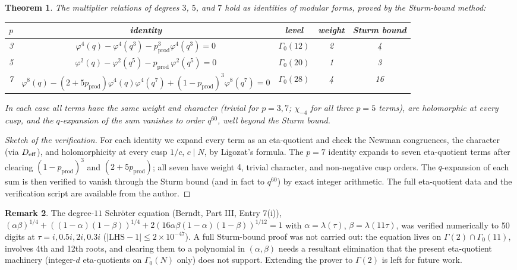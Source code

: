 \documentclass[11pt]{amsart}
\theoremstyle{plain}
\newtheorem{theorem}{Theorem}[section]
\theoremstyle{definition}
\newtheorem{remark}[theorem]{Remark}
\theoremstyle{remark}
\newcommand{\pprod}{p_{\mathrm{prod}}}
\begin{document}
\begin{theorem}
The multiplier relations of degrees $3$, $5$, and $7$ hold as identities of modular
forms, proved by the Sturm-bound method:
\begin{center}
\begin{tabular}{c|c|c|c|c}
$p$ & identity & level & weight & Sturm bound \\ \hline
3 & $\varphi^4(q) - \varphi^4(q^3) - \pprod^3\varphi^4(q^3) = 0$ & $\Gamma_0(12)$ & 2 & 4 \\
5 & $\varphi^2(q) - \varphi^2(q^5) - \pprod\,\varphi^2(q^5) = 0$ & $\Gamma_0(20)$ & 1 & 3 \\
7 & $\varphi^8(q) - (2+5\pprod)\varphi^4(q)\varphi^4(q^7)
+ (1-\pprod)^3\varphi^8(q^7) = 0$ & $\Gamma_0(28)$ & 4 & 16
\end{tabular}
\end{center}
In each case all terms have the same weight and character (trivial for $p=3,7$;
$\chi_{-4}$ for all three $p=5$ terms), are holomorphic at every cusp, and the
$q$-expansion of the sum vanishes to order $q^{60}$, well beyond the Sturm bound.
\end{theorem}

\begin{proof}[Sketch of the verification]
For each identity we expand every term as an eta-quotient and check the Newman
congruences, the character (via $D_{\rm eff}$), and holomorphicity at every cusp
$1/c$, $c \mid N$, by Ligozat's formula. The $p=7$ identity expands to seven
eta-quotient terms after clearing $(1-\pprod)^3$ and $(2+5\pprod)$; all seven have
weight $4$, trivial character, and non-negative cusp orders. The $q$-expansion of
each sum is then verified to vanish through the Sturm bound (and in fact to $q^{60}$)
by exact integer arithmetic. The full eta-quotient data and the verification script
are available from the author.
\end{proof}

\begin{remark}
The degree-$11$ Schr\"oter equation (Berndt, Part III, Entry 7(i)),
$(\alpha\beta)^{1/4} + ((1-\alpha)(1-\beta))^{1/4}
+ 2(16\alpha\beta(1-\alpha)(1-\beta))^{1/12} = 1$ with
$\alpha = \lambda(\tau)$, $\beta = \lambda(11\tau)$, was verified numerically to
50 digits at $\tau = i, 0.5i, 2i, 0.3i$ ($|\mathrm{LHS}-1| \leq 2\times 10^{-47}$).
A full Sturm-bound proof was not carried out: the equation lives on
$\Gamma(2)\cap\Gamma_0(11)$, involves 4th and 12th roots, and clearing them to a
polynomial in $(\alpha,\beta)$ needs a resultant elimination that the present
eta-quotient machinery (integer-$d$ eta-quotients on $\Gamma_0(N)$ only) does not
support. Extending the prover to $\Gamma(2)$ is left for future work.
\end{remark}
\end{document}
